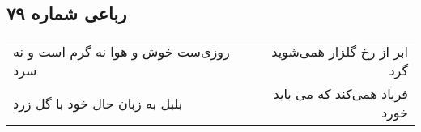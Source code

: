 \begin{center}
\section*{رباعی شماره ۷۹}
\label{sec:sh079}
\begin{longtable}{l p{0.5cm} r}
روزی‌ست خوش و هوا نه گرم است و نه سرد
&&
ابر از رخ گلزار همی‌شوید گرد
\\
بلبل به زبان حال خود با گل زرد
&&
فریاد همی‌کند که می باید خورد
\\
\end{longtable}
\end{center}
